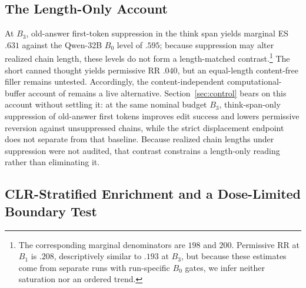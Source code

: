 \documentclass[letterpaper]{article} %
\begin{document}
\subsection{The Length-Only Account}
\label{sec:diagnosis-length}

At \(B_3\), old-answer first-token suppression in the think span yields marginal ES \(.631\) against the Qwen-32B \(B_0\) level of \(.595\); because suppression may alter realized chain length, these levels do not form a length-matched contrast.\footnote{The corresponding marginal denominators are \(198\) and \(200\).  Permissive RR at \(B_1\) is \(.208\), descriptively similar to \(.193\) at \(B_3\), but because these estimates come from separate runs with run-specific \(B_0\) gates, we infer neither saturation nor an ordered trend.} %
The short canned thought yields permissive RR \(.040\), but an equal-length content-free filler remains untested. %
Accordingly, the content-independent computational-buffer account of \citet{gekhman2026thinking} remains a live alternative.
Section~\ref{sec:control} bears on this account without settling it: at the same nominal budget \(B_3\), think-span-only suppression of old-answer first tokens improves edit success and lowers permissive reversion against unsuppressed chains, while the strict displacement endpoint does not separate from that baseline.  Because realized chain lengths under suppression were not audited, that contrast constrains a length-only reading rather than eliminating it.

\subsection{CLR-Stratified Enrichment and a Dose-Limited Boundary Test}
\label{sec:diagnosis-boundaries}
\end{document}
